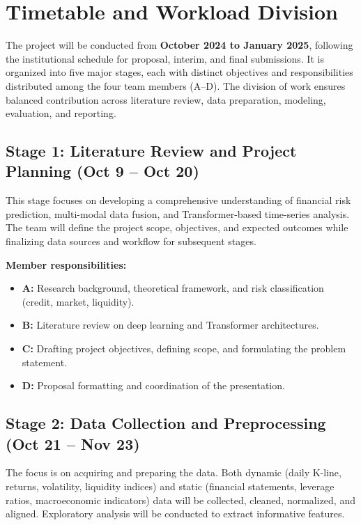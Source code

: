 \section{Timetable and Workload Division}
\label{sec:Timetable and workload division}
The project will be conducted from \textbf{October 2024 to January 2025}, following the institutional schedule for proposal, interim, and final submissions.
It is organized into five major stages, each with distinct objectives and responsibilities distributed among the four team members (A--D).
The division of work ensures balanced contribution across literature review, data preparation, modeling, evaluation, and reporting.

\subsection{Stage 1: Literature Review and Project Planning (Oct 9 -- Oct 20)}
This stage focuses on developing a comprehensive understanding of financial risk prediction, multi-modal data fusion, and Transformer-based time-series analysis.
The team will define the project scope, objectives, and expected outcomes while finalizing data sources and workflow for subsequent stages.

\textbf{Member responsibilities:}
\begin{itemize}
    \item \textbf{A:} Research background, theoretical framework, and risk classification (credit, market, liquidity).
    \item \textbf{B:} Literature review on deep learning and Transformer architectures.
    \item \textbf{C:} Drafting project objectives, defining scope, and formulating the problem statement.
    \item \textbf{D:} Proposal formatting and coordination of the presentation.
\end{itemize}

\subsection{Stage 2: Data Collection and Preprocessing (Oct 21 -- Nov 23)}
The focus is on acquiring and preparing the data. Both dynamic (daily K-line, returns, volatility, liquidity indices) and static (financial statements, leverage ratios, macroeconomic indicators) data will be collected, cleaned, normalized, and aligned. Exploratory analysis will be conducted to extract informative features.


